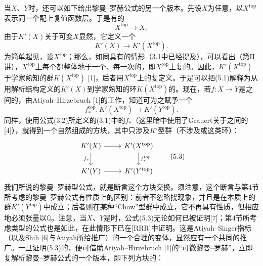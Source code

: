 当$X$、$Y$时，还可以如下给出黎曼--罗赫公式的另一个版本。先设$X$为任意，以$X^{\mathrm{top}}$表示同一个配上复值函数层。于是有的
\[X^{\mathrm{top}}\longrightarrow X;\]
由于$K'(X)$关于可变$X$显然，它定义一个
\[K'(X)\longrightarrow K'(X^{\mathrm{top}}).\tag{5.1}\]
为简单起见，设$X^{\mathrm{top}}$；那么，如同具有的情形（3.1中已经提及），可以看出（第II讲），$X^{\mathrm{top}}$上每个都整体地于一个、每一次的，即$X^{\mathrm{top}}$上复的。因此，$K'(X^{\mathrm{top}})$于学家熟知的群$K(X^{\mathrm{top}})$ [1]，后者用$X^{\mathrm{top}}$上的复定义。于是可以把(5.1)解释为从用解析结构定义的$K'(X)$到学家熟知的环$K(X^{\mathrm{top}})$的。现在，若$f:X\longrightarrow Y$是之间的，由Atiyah--Hirzebruch [1]的工作，知道可为之赋予一个
\[f_*^{\mathrm{top}}:K'(X^{\mathrm{top}})\longrightarrow K'(Y^{\mathrm{top}}).\tag{5.2}\]
同样，使用公式(3.2)所定义的(3.1)中的$f_*$（这里暗中使用了Grauert关于之间的[4]），就得到一个自然组成的方块，其中只涉及$K'$型群（不涉及或这类环）：
\[
\begin{tikzcd}
K'(X) \arrow[r] \arrow[d,"f_*"'] & K'(X^{\mathrm{top}}) \arrow[d,"f_*^{\mathrm{top}}"] \\
K'(Y) \arrow[r] & K'(Y^{\mathrm{top}})
\end{tikzcd}
\tag{5.3}
\]
我们所说的黎曼--罗赫型公式，就是断言这个方块交换。须注意，这个断言与第4节所考虑的黎曼--罗赫公式有性质上的区别：前者不忽略挠现象，并且是在本质上的群$K'(Y^{\mathrm{top}})$中成立；后者则在某种“Chow”型群中成立，它不再具有性质，但相应地必须张量以$\mathbb Q$。注意，当$X$、$Y$是时，公式(5.3)无论如何已被证明[7]；第4节所考虑类型的公式也是如此，在此情形下已在[RRR]中证明。这是Atiyah--Singer指标（以及Shih [6]与Atiyah所给推广）的一个合理的变体，显然应有一个共同的推广。一旦证明(5.3)的，便可借助Atiyah--Hirzebruch [1]的“可微黎曼--罗赫”，立即复解析黎曼--罗赫公式的一个版本，即下列方块的：
